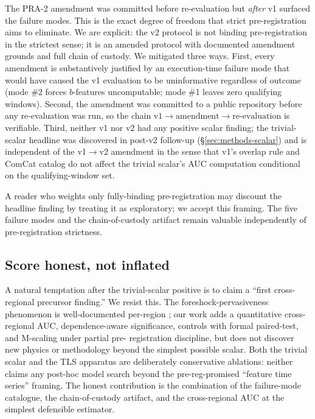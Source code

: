 \documentclass[11pt]{article}
\begin{document}
The PRA-2 amendment was committed before re-evaluation but \emph{after}
v1 surfaced the failure modes. This is the exact degree of freedom that
strict pre-registration aims to eliminate. We are explicit: the v2
protocol is not binding pre-registration in the strictest sense; it is
an amended protocol with documented amendment grounds and full chain
of custody. We mitigated three ways. First, every amendment is
substantively justified by an execution-time failure mode that would
have caused the v1 evaluation to be uninformative regardless of
outcome (mode \#2 forces $b$-features uncomputable; mode \#1 leaves
zero qualifying windows). Second, the amendment was committed to a
public repository before any re-evaluation was run, so the chain
$\mathrm{v1 \to amendment \to re\text{-}evaluation}$ is verifiable.
Third, neither v1 nor v2 had any positive scalar finding; the trivial-
scalar headline was discovered in post-v2 follow-up
(\S\ref{sec:methods-scalar}) and is independent of the v1$\to$v2
amendment in the sense that v1's overlap rule and ComCat catalog do
not affect the trivial scalar's AUC computation conditional on the
qualifying-window set.

A reader who weights only fully-binding pre-registration may discount
the headline finding by treating it as exploratory; we accept this
framing. The five failure modes and the chain-of-custody artifact
remain valuable independently of pre-registration strictness.

\subsection{Score honest, not inflated}

A natural temptation after the trivial-scalar positive is to claim a
``first cross-regional precursor finding.'' We resist this. The
foreshock-pervasiveness phenomenon is well-documented per-region
\citep{trugman2019, lippiello2025, khan2025, moutote2021}; our work
adds a quantitative cross-regional AUC, dependence-aware significance,
controls with formal paired-test, and M-scaling under partial pre-
registration discipline, but does not discover new physics or
methodology beyond the simplest possible scalar. Both the trivial
scalar and the TLS apparatus are deliberately conservative ablations:
neither claims any post-hoc model search beyond the pre-reg-promised
``feature time series'' framing. The honest contribution is the
combination of the failure-mode catalogue, the chain-of-custody
artifact, and the cross-regional AUC at the simplest defensible
estimator.
\end{document}
